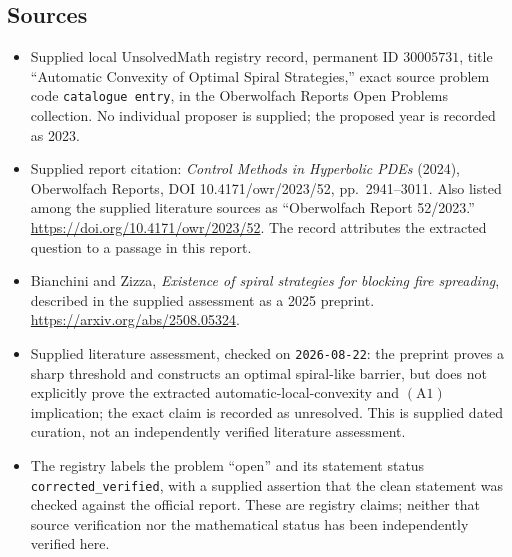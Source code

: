 \documentclass[11pt]{article}
\begin{document}
\subsection{Sources}
\begin{itemize}
\item Supplied local UnsolvedMath registry record, permanent ID \(30005731\), title ``Automatic Convexity of Optimal Spiral Strategies,'' exact source problem code \texttt{catalogue entry}, in the Oberwolfach Reports Open Problems collection. No individual proposer is supplied; the proposed year is recorded as 2023.
\item Supplied report citation: \emph{Control Methods in Hyperbolic PDEs} (2024), Oberwolfach Reports, DOI 10.4171/owr/2023/52, pp.\ 2941--3011. Also listed among the supplied literature sources as ``Oberwolfach Report 52/2023.'' \url{https://doi.org/10.4171/owr/2023/52}. The record attributes the extracted question to a passage in this report.
\item Bianchini and Zizza, \emph{Existence of spiral strategies for blocking fire spreading}, described in the supplied assessment as a 2025 preprint. \url{https://arxiv.org/abs/2508.05324}.
\item Supplied literature assessment, checked on \texttt{2026-08-22}: the preprint proves a sharp threshold and constructs an optimal spiral-like barrier, but does not explicitly prove the extracted automatic-local-convexity and \((\mathrm{A1})\) implication; the exact claim is recorded as unresolved. This is supplied dated curation, not an independently verified literature assessment.
\item The registry labels the problem ``open'' and its statement status \texttt{corrected\_verified}, with a supplied assertion that the clean statement was checked against the official report. These are registry claims; neither that source verification nor the mathematical status has been independently verified here.
\end{itemize}
\end{document}
